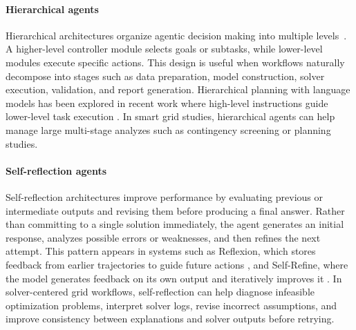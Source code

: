 \documentclass[journal,onecolumn]{IEEEtran} %
\begin{document}
\paragraph{Hierarchical agents}
Hierarchical architectures organize agentic decision making into multiple levels~\cite{ichter2023saycan,liu2023hla}. A higher-level controller module selects goals or subtasks, while lower-level modules execute specific actions. This design is useful when workflows naturally decompose into stages such as data preparation, model construction, solver execution, validation, and report generation. Hierarchical planning with language models has been explored in recent work where high-level instructions guide lower-level task execution \cite{huang2022language}. In smart grid studies, hierarchical agents can help manage large multi-stage analyzes such as contingency screening or planning studies.

\paragraph{Self-reflection agents}
Self-reflection architectures improve performance by evaluating previous or intermediate outputs and revising them before producing a final answer. Rather than committing to a single solution immediately, the agent generates an initial response, analyzes possible errors or weaknesses, and then refines the next attempt. This pattern appears in systems such as Reflexion, which stores feedback from earlier trajectories to guide future actions \cite{shinn2023reflexion}, and Self-Refine, where the model generates feedback on its own output and iteratively improves it \cite{madaan2023selfrefine}. In solver-centered grid workflows, self-reflection can help diagnose infeasible optimization problems, interpret solver logs, revise incorrect assumptions, and improve consistency between explanations and solver outputs before retrying.
\end{document}
